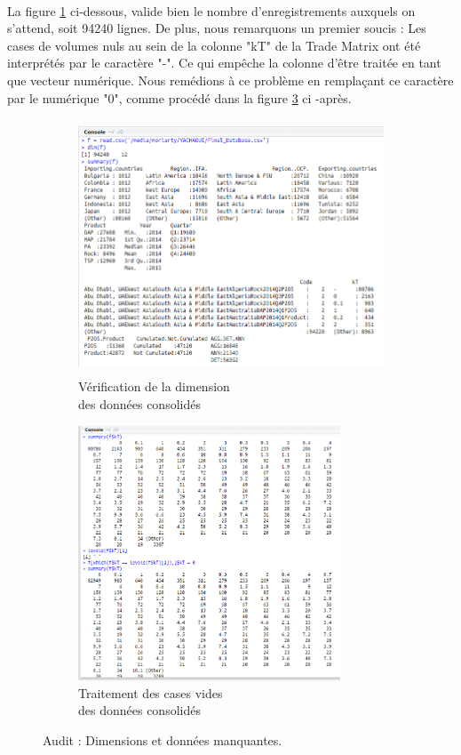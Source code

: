 \paragraph{}
		La figure \ref{fig:size} ci-dessous, valide bien le nombre d'enregistrements auxquels on s'attend, soit 94240 lignes. De plus, nous remarquons un premier soucis : Les cases de volumes nuls au sein de la colonne "kT" de la Trade Matrix ont été interprétés par le caractère "-". Ce qui empêche la colonne d'être traitée en tant que vecteur numérique. Nous remédions à ce problème en remplaçant ce caractère par le numérique "0", comme procédé dans la figure \ref{fig:nas} ci -après.
		\newline
			\begin{figure}[H]
			\begin{subfigure}{.5\textwidth}
				\centering
				\includegraphics[height=215pt]{1}
				\caption{Vérification de la dimension\\des données consolidés}
				\label{fig:size}
			\end{subfigure}
			\begin{subfigure}{.5\textwidth}
					\centering
					\includegraphics[height=215pt]{2}
					\caption{Traitement des cases vides\\des données consolidés}
					\label{fig:nas}
			\end{subfigure}
			\caption{Audit : Dimensions et données manquantes.}
				\end{figure}
				
